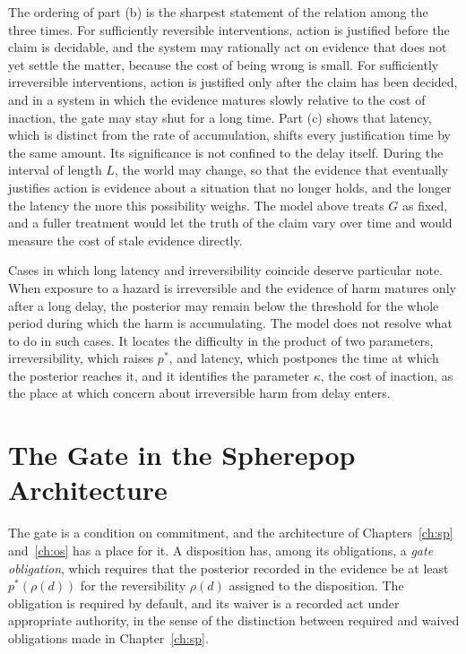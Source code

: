 \documentclass[11pt,twoside,openright]{book}
\theoremstyle{plain}
\theoremstyle{definition}
\theoremstyle{remark}
\begin{document}
The ordering of part (b) is the sharpest statement of the relation among the three times. For sufficiently reversible interventions, action is justified before the claim is decidable, and the system may rationally act on evidence that does not yet settle the matter, because the cost of being wrong is small. For sufficiently irreversible interventions, action is justified only after the claim has been decided, and in a system in which the evidence matures slowly relative to the cost of inaction, the gate may stay shut for a long time. Part (c) shows that latency, which is distinct from the rate of accumulation, shifts every justification time by the same amount. Its significance is not confined to the delay itself. During the interval of length $L$, the world may change, so that the evidence that eventually justifies action is evidence about a situation that no longer holds, and the longer the latency the more this possibility weighs. The model above treats $G$ as fixed, and a fuller treatment would let the truth of the claim vary over time and would measure the cost of stale evidence directly.

Cases in which long latency and irreversibility coincide deserve particular note. When exposure to a hazard is irreversible and the evidence of harm matures only after a long delay, the posterior may remain below the threshold for the whole period during which the harm is accumulating. The model does not resolve what to do in such cases. It locates the difficulty in the product of two parameters, irreversibility, which raises $p^*$, and latency, which postpones the time at which the posterior reaches it, and it identifies the parameter $\kappa$, the cost of inaction, as the place at which concern about irreversible harm from delay enters.

\section{The Gate in the Spherepop Architecture}

The gate is a condition on commitment, and the architecture of Chapters~\ref{ch:sp} and~\ref{ch:os} has a place for it. A disposition has, among its obligations, a \emph{gate obligation}, which requires that the posterior recorded in the evidence be at least $p^*(\rho(d))$ for the reversibility $\rho(d)$ assigned to the disposition. The obligation is required by default, and its waiver is a recorded act under appropriate authority, in the sense of the distinction between required and waived obligations made in Chapter~\ref{ch:sp}.
\end{document}
